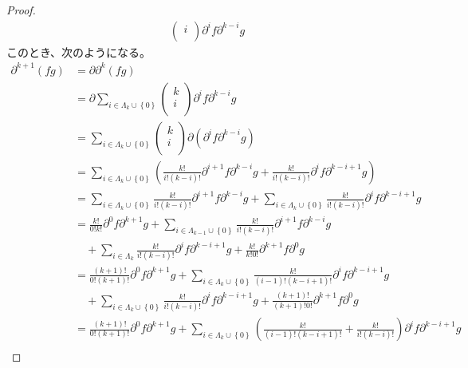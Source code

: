 \documentclass[dvipdfmx]{jsarticle}
\begin{document}
\begin{proof}
\begin{align*}
{\begin{pmatrix}
i \\
\end{pmatrix}\partial^{i}f\partial^{k - i}g}
\end{align*}
このとき、次のようになる。
\begin{align*}
\partial^{k + 1}(fg) &= \partial\partial^{k}(fg)\\
&= \partial\sum_{i \in \varLambda_{k} \cup \left\{ 0 \right\}} {\begin{pmatrix}
k \\
i \\
\end{pmatrix}\partial^{i}f\partial^{k - i}g}\\
&= \sum_{i \in \varLambda_{k} \cup \left\{ 0 \right\}} {\begin{pmatrix}
k \\
i \\
\end{pmatrix}\partial\left( \partial^{i}f\partial^{k - i}g \right)}\\
&= \sum_{i \in \varLambda_{k} \cup \left\{ 0 \right\}} \left( \frac{k!}{i!(k - i)!}\partial^{i + 1}f\partial^{k - i}g + \frac{k!}{i!(k - i)!}\partial^{i}f\partial^{k - i + 1}g \right)\\
&= \sum_{i \in \varLambda_{k} \cup \left\{ 0 \right\}} {\frac{k!}{i!(k - i)!}\partial^{i + 1}f\partial^{k - i}g} + \sum_{i \in \varLambda_{k} \cup \left\{ 0 \right\}} {\frac{k!}{i!(k - i)!}\partial^{i}f\partial^{k - i + 1}g}\\
&= \frac{k!}{0!k!}\partial^{0}f\partial^{k + 1}g + \sum_{i \in \varLambda_{k - 1} \cup \left\{ 0 \right\}} {\frac{k!}{i!(k - i)!}\partial^{i + 1}f\partial^{k - i}g} \\
&\quad + \sum_{i \in \varLambda_{k}} {\frac{k!}{i!(k - i)!}\partial^{i}f\partial^{k - i + 1}g} + \frac{k!}{k!0!}\partial^{k + 1}f\partial^{0}g\\
&= \frac{(k + 1)!}{0!(k + 1)!}\partial^{0}f\partial^{k + 1}g + \sum_{i \in \varLambda_{k} \cup \left\{ 0 \right\}} {\frac{k!}{(i - 1)!(k - i + 1)!}\partial^{i}f\partial^{k - i + 1}g} \\
&\quad + \sum_{i \in \varLambda_{k} \cup \left\{ 0 \right\}} {\frac{k!}{i!(k - i)!}\partial^{i}f\partial^{k - i + 1}g} + \frac{(k + 1)!}{(k + 1)!0!}\partial^{k + 1}f\partial^{0}g\\
&= \frac{(k + 1)!}{0!(k + 1)!}\partial^{0}f\partial^{k + 1}g + \sum_{i \in \varLambda_{k} \cup \left\{ 0 \right\}} {\left( \frac{k!}{(i - 1)!(k - i + 1)!} + \frac{k!}{i!(k - i)!} \right)\partial^{i}f\partial^{k - i + 1}g} \\

\end{align*}
\end{proof}
\end{document}
